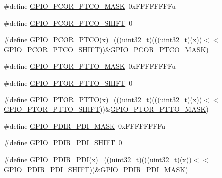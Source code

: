\begin{DoxyCompactItemize}
\item 
\#define \hyperlink{group___g_p_i_o___register___masks_ga0b8378768ee61ea2c685a1687c90fa03}{G\+P\+I\+O\+\_\+\+P\+C\+O\+R\+\_\+\+P\+T\+C\+O\+\_\+\+M\+A\+SK}~0x\+F\+F\+F\+F\+F\+F\+F\+Fu
\item 
\#define \hyperlink{group___g_p_i_o___register___masks_ga5c9203b830cbd86cd8d0189872b5c772}{G\+P\+I\+O\+\_\+\+P\+C\+O\+R\+\_\+\+P\+T\+C\+O\+\_\+\+S\+H\+I\+FT}~0
\item 
\#define \hyperlink{group___g_p_i_o___register___masks_ga3435ac6150be0f65562e575f41463272}{G\+P\+I\+O\+\_\+\+P\+C\+O\+R\+\_\+\+P\+T\+CO}(x)                                            ~(((uint32\+\_\+t)(((uint32\+\_\+t)(x))$<$$<$\hyperlink{group___g_p_i_o___register___masks_ga5c9203b830cbd86cd8d0189872b5c772}{G\+P\+I\+O\+\_\+\+P\+C\+O\+R\+\_\+\+P\+T\+C\+O\+\_\+\+S\+H\+I\+FT}))\&\hyperlink{group___g_p_i_o___register___masks_ga0b8378768ee61ea2c685a1687c90fa03}{G\+P\+I\+O\+\_\+\+P\+C\+O\+R\+\_\+\+P\+T\+C\+O\+\_\+\+M\+A\+SK})
\item 
\#define \hyperlink{group___g_p_i_o___register___masks_gaa75953b5d9d23bdaa6c24232e1a52680}{G\+P\+I\+O\+\_\+\+P\+T\+O\+R\+\_\+\+P\+T\+T\+O\+\_\+\+M\+A\+SK}~0x\+F\+F\+F\+F\+F\+F\+F\+Fu
\item 
\#define \hyperlink{group___g_p_i_o___register___masks_ga70e5442b3a119665aafb9e6e5b48bbd5}{G\+P\+I\+O\+\_\+\+P\+T\+O\+R\+\_\+\+P\+T\+T\+O\+\_\+\+S\+H\+I\+FT}~0
\item 
\#define \hyperlink{group___g_p_i_o___register___masks_gad89d527b4c87f933192b313f79f96438}{G\+P\+I\+O\+\_\+\+P\+T\+O\+R\+\_\+\+P\+T\+TO}(x)                                            ~(((uint32\+\_\+t)(((uint32\+\_\+t)(x))$<$$<$\hyperlink{group___g_p_i_o___register___masks_ga70e5442b3a119665aafb9e6e5b48bbd5}{G\+P\+I\+O\+\_\+\+P\+T\+O\+R\+\_\+\+P\+T\+T\+O\+\_\+\+S\+H\+I\+FT}))\&\hyperlink{group___g_p_i_o___register___masks_gaa75953b5d9d23bdaa6c24232e1a52680}{G\+P\+I\+O\+\_\+\+P\+T\+O\+R\+\_\+\+P\+T\+T\+O\+\_\+\+M\+A\+SK})
\item 
\#define \hyperlink{group___g_p_i_o___register___masks_gacb7c8cc976937906c8e803811a7fbb68}{G\+P\+I\+O\+\_\+\+P\+D\+I\+R\+\_\+\+P\+D\+I\+\_\+\+M\+A\+SK}~0x\+F\+F\+F\+F\+F\+F\+F\+Fu
\item 
\#define \hyperlink{group___g_p_i_o___register___masks_ga99fd9212dd769bb1964a28a864c6c741}{G\+P\+I\+O\+\_\+\+P\+D\+I\+R\+\_\+\+P\+D\+I\+\_\+\+S\+H\+I\+FT}~0
\item 
\#define \hyperlink{group___g_p_i_o___register___masks_ga51ee39b660f7d6b95d1348601346dd0d}{G\+P\+I\+O\+\_\+\+P\+D\+I\+R\+\_\+\+P\+DI}(x)                                              ~(((uint32\+\_\+t)(((uint32\+\_\+t)(x))$<$$<$\hyperlink{group___g_p_i_o___register___masks_ga99fd9212dd769bb1964a28a864c6c741}{G\+P\+I\+O\+\_\+\+P\+D\+I\+R\+\_\+\+P\+D\+I\+\_\+\+S\+H\+I\+FT}))\&\hyperlink{group___g_p_i_o___register___masks_gacb7c8cc976937906c8e803811a7fbb68}{G\+P\+I\+O\+\_\+\+P\+D\+I\+R\+\_\+\+P\+D\+I\+\_\+\+M\+A\+SK})
$$
\end{DoxyCompactItemize}
